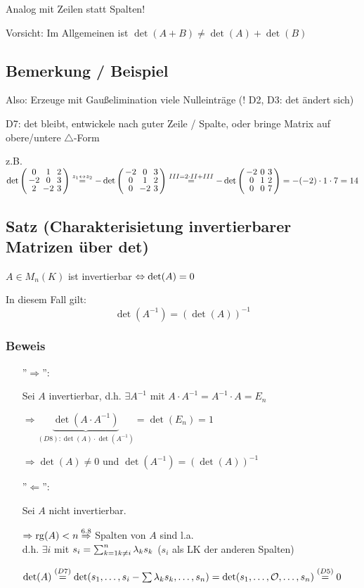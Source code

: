 Analog mit Zeilen statt Spalten!

Vorsicht: Im Allgemeinen ist $\det(A+B) \neq \det(A)+ \det(B)$


\subsection{Bemerkung / Beispiel}

Also: Erzeuge mit Gaußelimination viele Nulleinträge (! D2, D3: det ändert sich)
 
D7: det bleibt, entwickele nach guter Zeile / Spalte, oder bringe Matrix auf obere/untere $\triangle$-Form

z.B. 
\\$\det\aMatrix{ccc}{
0 & 1 & 2 \\
-2& 0 & 3 \\
2 & -2& 3}
	\stackrel{z_1\leftrightarrow z_2}{=}
	- \det\aMatrix{ccc}{
-2 & 0 & 3 \\
0  & 1 & 2 \\
0  & -2& 3}
	\stackrel{III=2\cdot II+III}{=}
	- \det \aMatrix{ccc}{
-2 & 0 & 3 \\
0  & 1 & 2 \\
0  & 0 & 7}
	= 
	- (-2) \cdot 1 \cdot 7 = 14$
 
 
\subsection{Satz (Charakterisietung invertierbarer Matrizen über det)}

$A \in M_n(K)$ ist invertierbar $\Leftrightarrow \det(A) = 0$

In diesem Fall gilt:
\[\det(A^{-1}) = (\det(A))^{-1} \]

\subsubsection*{Beweis} 
\begin{itemize}
	\item[''$\Rightarrow$'':]
	
	Sei $A$ invertierbar, d.h. $\exists A^{-1}$ mit $A\cdot A^{-1} = A^{-1}\cdot A = E_n$
	
	$\Rightarrow \underbrace{\det(A\cdot A^{-1})}_{(D8): \det(A) \cdot \det(A^{-1})} = \det(E_n) = 1$
	
	 $\Rightarrow \det(A) \neq 0$ und $\det(A^{-1}) = (\det(A))^{-1}$
	 
	 \item[''$\Leftarrow$'':]
	 
	 Sei $A$ nicht invertierbar.
	 
	 $\Rightarrow \mathrm{ rg }(A) < n
	 \\ \stackrel{6.8}{\Rightarrow}$ Spalten von $A$ sind l.a. %
	 \\ d.h. $\exists i$ mit $s_i = \sum_{k=1\\k\neq i}^{n}\lambda_k s_k$ ($s_i$ als LK der anderen Spalten)
	 
	 $\det(A) \stackrel{(D7)}{=} \det(s_1, \dots, s_i- \sum\lambda_ks_k, \dots, s_n)
	 \\ = \det(s_1, \dots, \mathcal{O}, \dots, s_n) 
	 \stackrel{(D5)}{=} 0$
	
	
\end{itemize} 

